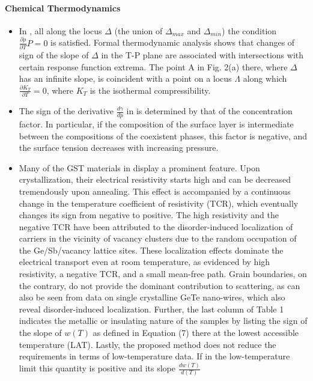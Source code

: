 \documentclass[11pt]{book}
\begin{document}
\paragraph{Chemical Thermodynamics}
\begin{itemize}
\item In \cite{poole2005density},
all along the locus $\Delta$ (the union of $\Delta_{max}$ and $\Delta_{min}$)
the condition $\frac{\partial\rho}{\partial T}P=0$ is satisfied.
Formal thermodynamic analysis shows that changes of sign of the slope
of $\Delta$ in the T-P plane are associated with intersections with
certain response function extrema. The point A in Fig. 2(a) there,
where $\Delta$ has an infinite slope, is coincident with a point
on a locus $\Lambda$ along which $\frac{\partial K_{T}}{\partial T}=0$,
where $K_{T}$ is the isothermal compressibility.
\item The sign of the derivative $\frac{d\gamma}{dp}$ in \cite{baidakov2012surface}
is determined by that of the concentration factor. In particular,
if the composition of the surface layer is intermediate between the
compositions of the coexistent phases, this factor is negative, and
the surface tension decreases with increasing pressure.
\item Many of the GST materials in \cite{volker2015low}
display a prominent feature. Upon crystallization, their electrical
resistivity starts high and can be decreased tremendously upon annealing.
This effect is accompanied by a continuous change in the temperature
coefficient of resistivity (TCR), which eventually changes its sign
from negative to positive. The high resistivity and the negative TCR
have been attributed to the disorder-induced localization of carriers
in the vicinity of vacancy clusters due to the random occupation of
the Ge/Sb/vacancy lattice sites. These localization effects dominate
the electrical transport even at room temperature, as evidenced by
high resistivity, a negative TCR, and a small mean-free path. Grain
boundaries, on the contrary, do not provide the dominant contribution
to scattering, as can also be seen from data on single crystalline
GeTe nano-wires, which also reveal disorder-induced localization.
Further, the last column of Table 1 indicates the metallic or insulating
nature of the samples by listing the sign of the slope of $w\left(T\right)$
as defined in Equation (7) there at the lowest accessible temperature
(LAT). Lastly, the proposed method does not reduce the requirements
in terms of low-temperature data. If in the low-temperature limit
this quantity is positive and its slope $\frac{dw\left(T\right)}{d\left(T\right)}$

\end{itemize}
\end{document}
